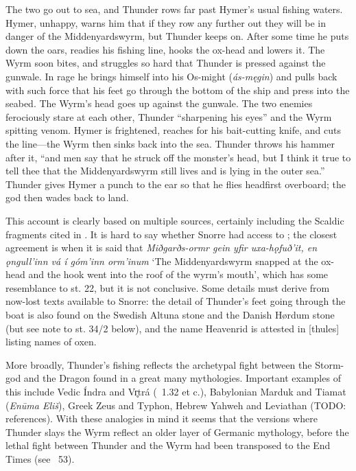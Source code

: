 {The two go out to sea, and Thunder rows far past Hymer’s usual fishing waters.  Hymer, unhappy, warns him that if they row any further out they will be in danger of the Middenyardswyrm, but Thunder keeps on.  After some time he puts down the oars, readies his fishing line, hooks the ox-head and lowers it.  The Wyrm soon bites, and struggles so hard that Thunder is pressed against the gunwale.  In rage he brings himself into his Os-might (\emph{ás-męgin}) and pulls back with such force that his feet go through the bottom of the ship and press into the seabed.  The Wyrm's head goes up against the gunwale.  The two enemies ferociously stare at each other, Thunder “sharpening his eyes” and the Wyrm spitting venom.  Hymer is frightened, reaches for his bait-cutting knife, and cuts the line—the Wyrm then sinks back into the sea.  Thunder throws his hammer after it, “and men say that he struck off the monster’s head, but I think it true to tell thee that the Middenyardswyrm still lives and is lying in the outer sea.”  Thunder gives Hymer a punch to the ear so that he flies headfirst overboard; the god then wades back to land.

This account is clearly based on multiple sources, certainly including the Scaldic fragments cited in \Skaldskaparmal.  It is hard to say whether Snorre had access to \Hymiskvida; the closest agreement is when it is said that \emph{Miðgarðs-ormr gein yfir uxa-hǫfuð’it, en ǫngull’inn vá í góm’inn orm’inum} ‘The Middenyardswyrm snapped at the ox-head and the hook went into the roof of the wyrm’s mouth’, which has some resemblance to st. 22, but it is not conclusive.  Some details must derive from now-lost texts available to Snorre: the detail of Thunder’s feet going through the boat is also found on the Swedish Altuna stone and the Danish Hørdum stone (but see note to st. 34/2 below), and the name Heavenrid is attested in [thules] listing names of oxen.

More broadly, Thunder’s fishing reflects the archetypal fight between the Storm-god and the Dragon found in a great many mythologies.  Important examples of this include Vedic Índra and Vr̥trá (\Rigveda\ 1.32 et c.), Babylonian Marduk and Tiamat (\emph{Enūma Eliš}), Greek Zeus and Typhon, Hebrew Yahweh and Leviathan (TODO: references).  With these analogies in mind it seems that the versions where Thunder slays the Wyrm reflect an older layer of Germanic mythology, before the lethal fight between Thunder and the Wyrm had been transposed to the End Times (see \Voluspa\ 53).}


